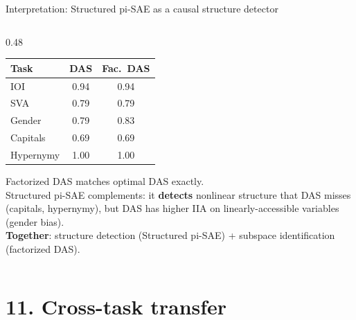 \documentclass[aspectratio=169,11pt]{beamer}
\begin{document}
\begin{frame}{Interpretation: Structured pi-SAE as a causal structure detector}
\begin{columns}[T]
\begin{column}{0.48\textwidth}
\vspace{0.2em}
{\scriptsize\centering
\renewcommand{\arraystretch}{1.15}
\begin{tabular}{l|cc}
\toprule
\textbf{Task} & \textbf{DAS} & \textbf{Fac.\ DAS} \\
\midrule
IOI       & 0.94 & 0.94 \\
SVA       & 0.79 & 0.79 \\
Gender    & 0.79 & 0.83 \\
Capitals  & 0.69 & 0.69 \\
Hypernymy & 1.00 & 1.00 \\
\bottomrule
\end{tabular}
}

\vspace{0.5em}
{\scriptsize Factorized DAS matches optimal DAS exactly.\\[0.2em]
Structured pi-SAE complements: it \textbf{detects} nonlinear structure that DAS misses (capitals, hypernymy), but DAS has higher IIA on linearly-accessible variables (gender bias).\\[0.2em]
\textbf{Together}: structure detection (Structured pi-SAE) + subspace identification (factorized DAS).}
\end{column}
\end{columns}
\end{frame}

\hypertarget{sec11}{}
\section{11. Cross-task transfer}
\end{document}
